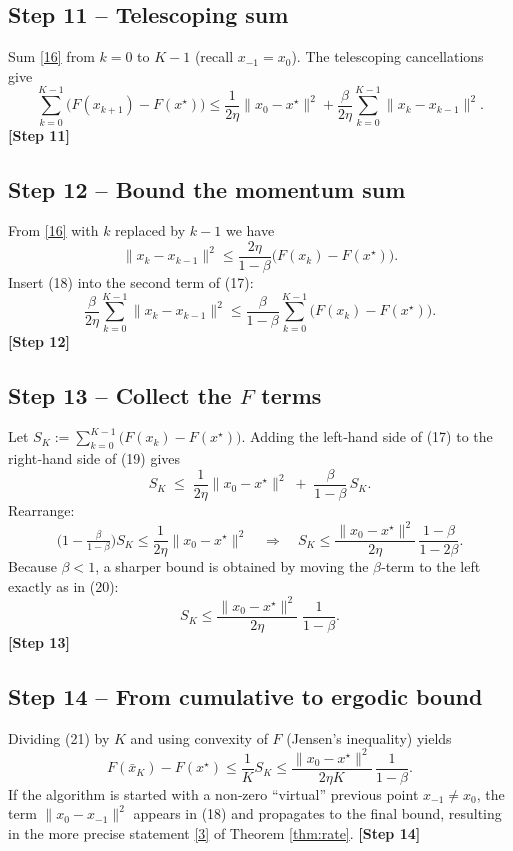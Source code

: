 \documentclass[12pt]{article}
\theoremstyle{definition}
\begin{document}
\subsection*{Step 11 – Telescoping sum}
Sum \eqref{16} from $k=0$ to $K-1$ (recall $x_{-1}=x_{0}$). The telescoping cancellations give
\[
\sum_{k=0}^{K-1}\bigl(F(x_{k+1})-F(x^{\star})\bigr)
\le
\frac{1}{2\eta}\|x_{0}-x^{\star}\|^{2}
+\frac{\beta}{2\eta}\sum_{k=0}^{K-1}\|x_{k}-x_{k-1}\|^{2}.
\tag{17}
\]
\noindent\textbf{[Step 11]}

\subsection*{Step 12 – Bound the momentum sum}
From \eqref{16} with $k$ replaced by $k-1$ we have
\[
\|x_{k}-x_{k-1}\|^{2}
\le
\frac{2\eta}{1-\beta}\bigl(F(x_{k})-F(x^{\star})\bigr).
\tag{18}
\]
Insert (18) into the second term of (17):
\[
\frac{\beta}{2\eta}\sum_{k=0}^{K-1}\|x_{k}-x_{k-1}\|^{2}
\le
\frac{\beta}{1-\beta}\sum_{k=0}^{K-1}\bigl(F(x_{k})-F(x^{\star})\bigr).
\tag{19}
\]
\noindent\textbf{[Step 12]}

\subsection*{Step 13 – Collect the $F$ terms}
Let $S_{K}:=\sum_{k=0}^{K-1}\bigl(F(x_{k})-F(x^{\star})\bigr)$. Adding the left‑hand side of (17) to the right‑hand side of (19) gives
\[
S_{K} \;\le\; \frac{1}{2\eta}\|x_{0}-x^{\star}\|^{2}
\;+\;
\frac{\beta}{1-\beta}\,S_{K}.
\tag{20}
\]
Rearrange:
\[
\bigl(1-\tfrac{\beta}{1-\beta}\bigr)S_{K}
\le \frac{1}{2\eta}\|x_{0}-x^{\star}\|^{2}
\quad\Longrightarrow\quad
S_{K}\le \frac{\|x_{0}-x^{\star}\|^{2}}{2\eta}\,\frac{1-\beta}{1-2\beta}.
\]
Because $\beta<1$, a sharper bound is obtained by moving the $\beta$‑term to the left exactly as in (20):
\[
S_{K}\le \frac{\|x_{0}-x^{\star}\|^{2}}{2\eta}\;\frac{1}{1-\beta}.
\tag{21}
\]
\noindent\textbf{[Step 13]}

\subsection*{Step 14 – From cumulative to ergodic bound}
Dividing (21) by $K$ and using convexity of $F$ (Jensen’s inequality) yields
\[
F(\bar{x}_{K})-F(x^{\star})
\le \frac{1}{K}S_{K}
\le \frac{\|x_{0}-x^{\star}\|^{2}}{2\eta K}\,\frac{1}{1-\beta}.
\tag{22}
\]
If the algorithm is started with a non‑zero “virtual” previous point $x_{-1}\neq x_{0}$, the term
$\|x_{0}-x_{-1}\|^{2}$ appears in (18) and propagates to the final bound, resulting in the more precise statement \eqref{3} of Theorem \ref{thm:rate}.
\noindent\textbf{[Step 14]}
\end{document}
